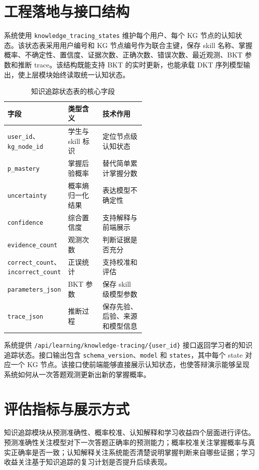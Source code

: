 \section{工程落地与接口结构}

系统使用 \texttt{knowledge\_tracing\_states} 维护每个用户、每个 KG 节点的认知状态。该状态表采用用户编号和 KG 节点编号作为联合主键，保存 skill 名称、掌握概率、不确定性、置信度、证据次数、正确次数、错误次数、最近观测、BKT 参数和推断 trace。该结构既能支持 BKT 的实时更新，也能承载 DKT 序列模型输出，使上层模块始终读取统一认知状态。

\begin{table}[H]
  \centering
  \caption{知识追踪状态表的核心字段}
  \label{tab:kt-state-table}
  \begin{tabularx}{\linewidth}{p{0.30\linewidth}p{0.25\linewidth}X}
    \toprule
    字段 & 类型含义 & 技术作用 \\
    \midrule
    \texttt{user\_id}、\texttt{kg\_node\_id} & 学生与 skill 标识 & 定位节点级认知状态 \\
    \texttt{p\_mastery} & 掌握后验概率 & 替代简单累计掌握分数 \\
    \texttt{uncertainty} & 概率熵归一化结果 & 表达模型不确定性 \\
    \texttt{confidence} & 综合置信度 & 支持解释与前端展示 \\
    \texttt{evidence\_count} & 观测次数 & 判断证据是否充分 \\
    \texttt{correct\_count}、\texttt{incorrect\_count} & 正误统计 & 支持校准和评估 \\
    \texttt{parameters\_json} & BKT 参数 & 保存 skill 级模型参数 \\
    \texttt{trace\_json} & 推断过程 & 保存先验、后验、来源和模型信息 \\
    \bottomrule
  \end{tabularx}
\end{table}

系统提供 \texttt{/api/learning/knowledge-tracing/\{user\_id\}} 接口返回学习者的知识追踪状态。接口输出包含 \texttt{schema\_version}、\texttt{model} 和 \texttt{states}，其中每个 state 对应一个 KG 节点。该接口使前端能够直接展示认知状态，也使答辩演示能够呈现系统如何从一次答题观测更新出新的掌握概率。

\section{评估指标与展示方式}

知识追踪模块从预测准确性、概率校准、认知解释和学习收益四个层面进行评估。预测准确性关注模型对下一次答题正确率的预测能力；概率校准关注掌握概率与真实正确率是否一致；认知解释关注系统能否清楚说明掌握判断来自哪些证据；学习收益关注基于知识追踪的复习计划是否提升后续表现。


